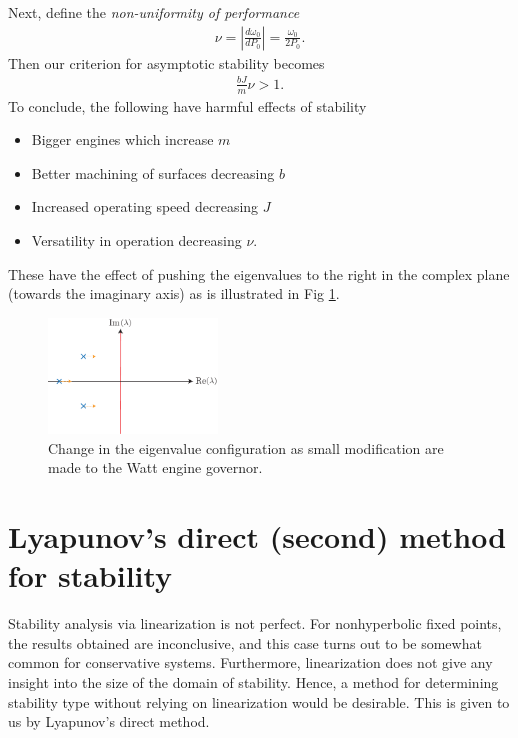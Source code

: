 \begin{ex}
\begin{enumerate}
\end{enumerate}
Next, define the \emph{non-uniformity of performance}
\begin{align}
	\nu = \left| \frac{d \omega_0}{d P_0} \right| = \frac{\omega_0}{2P_0}.
\end{align}
Then our criterion for asymptotic stability becomes
\begin{align}
\frac{bJ}{m}\nu > 1.	
\end{align}
To conclude, the following have harmful effects of stability
\begin{itemize}
	\item Bigger engines which increase $m$ 
	\item Better machining of surfaces decreasing $b$ 
	\item Increased operating speed decreasing $J$ 
	\item Versatility in operation decreasing $\nu $.
\end{itemize}
These have the effect of pushing the eigenvalues to the right in the complex plane (towards the imaginary axis) as is illustrated in Fig \ref{fig:watt_eigv}.
\begin{figure}[h!]
	\centering
	\includegraphics[width=0.4\textwidth]{figures/ch2/21watt_eigv}
	\caption{Change in the eigenvalue configuration as small modification are made to the Watt engine governor.}
	\label{fig:watt_eigv}
\end{figure}
\end{ex}
\newpage

\section{Lyapunov's direct (second) method for stability}
Stability analysis via linearization is not perfect. For nonhyperbolic fixed points, the results obtained are inconclusive, and this case turns out to be somewhat common for conservative systems. Furthermore, linearization does not give any insight into the size of the domain of stability. Hence, a method for determining stability type without relying on linearization would be desirable. This is given to us by Lyapunov's direct method.

